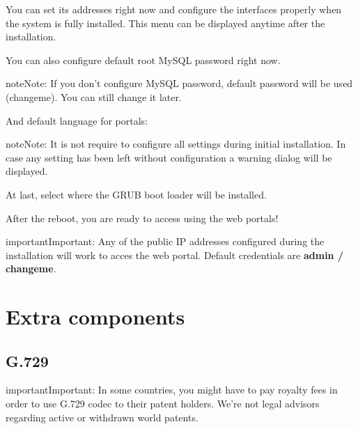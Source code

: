 \documentclass[letterpaper,10pt,english]{sphinxmanual}
\begin{document}
You can set its addresses right now and configure the interfaces properly when
the system is fully installed. This menu can be displayed anytime after the
installation.

\noindent{}

You can also configure default root MySQL password right now.

\begin{notice}{note}{Note:}
If you don't configure MySQL password, default password will be used
(changeme). You can still change it later.
\end{notice}

\noindent{}

And default language for portals:

\noindent{}

\begin{notice}{note}{Note:}
It is not require to configure all settings during initial
installation. In case any setting has been left without configuration a
warning dialog will be displayed.
\end{notice}

\noindent{}

At last, select where the GRUB boot loader will be installed.

\noindent{}

After the reboot, you are ready to access using the web portals!

\begin{notice}{important}{Important:}
Any of the public IP addresses configured during the
installation will work to acces the web portal. Default credentials are
\textbf{admin / changeme}.
\end{notice}


\section{Extra components}
\label{installation/extra_components::doc}\label{installation/extra_components:extra-components}

\subsection{G.729}
\label{installation/extra_components:g-729}
\begin{notice}{important}{Important:}
In some countries, you might have to pay royalty fees in order to
use G.729 codec to their patent holders. We're not legal advisors regarding
active or withdrawn world patents.
\end{notice}
\end{document}
